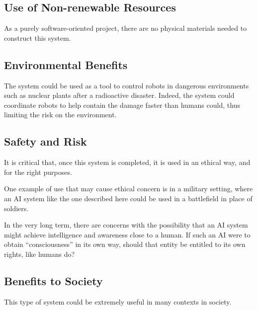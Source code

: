 \documentclass[titlepage,11pt]{article}
\begin{document}
\subsection{Use of Non-renewable Resources}

As a purely software-oriented project, there are no physical materials needed to construct this system.

\subsection{Environmental Benefits}

The system could be used as a tool to control robots in dangerous environments such as nuclear plants after a radioactive disaster. Indeed, the system could coordinate robots to help contain the damage faster than humans could, thus limiting the risk on the environment.

\subsection{Safety and Risk}

It is critical that, once this system is completed, it is used in an ethical way, and for the right purposes.

One example of use that may cause ethical concern is in a military setting, where an AI system like the one described here could be used in a battlefield in place of soldiers.

In the very long term, there are concerns with the possibility that an AI system might achieve intelligence and awareness close to a human. If such an AI were to obtain ``consciousness'' in its own way, should that entity be entitled to its own rights, like humans do?


\subsection{Benefits to Society}

This type of system could be extremely useful in many contexts in society.
\end{document}

